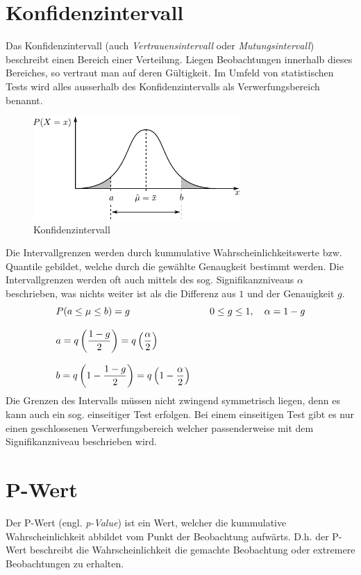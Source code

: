 \section{Konfidenzintervall}
Das Konfidenzintervall (auch \emph{Vertrauensintervall} oder 
\emph{Mutungsintervall}) beschreibt einen Bereich einer Verteilung.
Liegen Beobachtungen innerhalb dieses Bereiches, so vertraut man auf
deren Gültigkeit. Im Umfeld von statistischen Tests wird alles 
ausserhalb des Konfidenzintervalls als Verwerfungsbereich
benannt.

\begin{figure}[h!]
	\centering
	\includegraphics[width=0.7\textwidth]{konfidenzintervall.pdf}
	\caption{Konfidenzintervall}
	\label{fig:konfidenzintervall}
\end{figure}

Die Intervallgrenzen werden durch kummulative Wahrscheinlichkeitswerte
bzw. Quantile gebildet, welche durch die gewählte Genaugkeit bestimmt 
werden. Die Intervallgrenzen werden oft auch mittels des sog. 
Signifikanzniveaus $\alpha$ beschrieben, was nichts weiter ist als die 
Differenz aus $1$ und der Genauigkeit $g$.
\[ \begin{array}{l c l} 
	P(a \leq \mu \leq b) = g 
		& 
		& 0 \leq g \leq 1, \quad \alpha = 1-g \\
	& & \\
	 a = \displaystyle q\left(\frac{1-g}{2}\right) 
			= q\left( \frac{\alpha}{2} \right)
		&
		&\\
	& & \\
	b = \displaystyle q\left(1-\frac{1-g}{2}\right) 
			= q\left(1-\frac{\alpha}{2}\right) 
		&
		&\\
\end{array} \]
Die Grenzen des Intervalls müssen nicht zwingend symmetrisch liegen, 
denn es kann auch ein sog. einseitiger Test erfolgen. Bei einem 
einseitigen Test gibt es nur einen geschlossenen Verwerfungsbereich
welcher passenderweise mit dem Signifikanzniveau beschrieben wird.

\section{P-Wert}\label{sec:p-wert}
Der P-Wert (engl. \emph{p-Value}) ist ein Wert, welcher die kummulative 
Wahrscheinlichkeit abbildet vom Punkt der Beobachtung aufwärts. D.h.
der P-Wert beschreibt die Wahrscheinlichkeit die gemachte Beobachtung 
oder extremere Beobachtungen zu erhalten.

